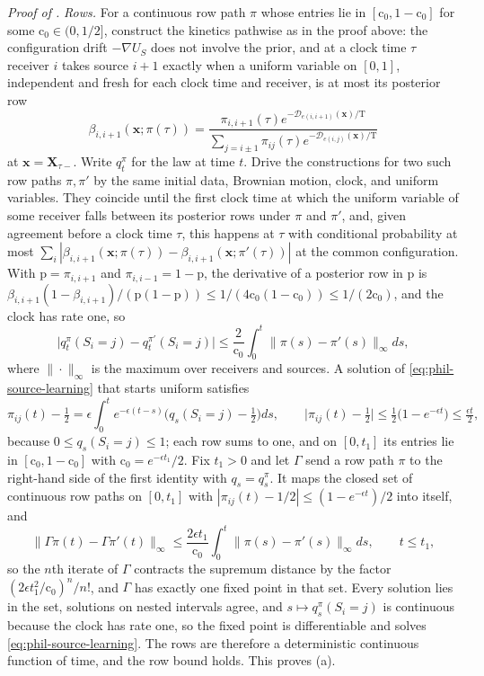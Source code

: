 \noindent\emph{Proof of .}
\emph{Rows.} For a continuous row path \(\pi\) whose entries lie in
\([\mathrm c_0,1-\mathrm c_0]\) for some \(\mathrm c_0\in(0,1/2]\), construct the
kinetics pathwise as in the proof above: the configuration drift
\(-\nabla U_S\) does not involve the prior, and at a clock time \(\tau\)
receiver \(i\) takes source \(i+1\) exactly when a uniform variable on
\([0,1]\), independent and fresh for each clock time and receiver, is at most
its posterior row
\[
\beta_{i,i+1}(\mathbf x;\pi(\tau))
=\frac{\pi_{i,i+1}(\tau)e^{-\mathcal D_{e(i,i+1)}(\mathbf x)/\mathrm T}}
{\sum_{j=i\pm1}\pi_{ij}(\tau)e^{-\mathcal D_{e(i,j)}(\mathbf x)/\mathrm T}}
\]
at \(\mathbf x=\mathbf X_{\tau-}\). Write \(q^\pi_t\) for the law at time
\(t\). Drive the constructions for two such row paths \(\pi,\pi'\) by the same
initial data, Brownian motion, clock, and uniform variables. They coincide
until the first clock time at which the uniform variable of some receiver falls
between its posterior rows under \(\pi\) and \(\pi'\), and, given agreement
before a clock time
\(\tau\), this happens at \(\tau\) with conditional probability at most
\(\sum_i|\beta_{i,i+1}(\mathbf x;\pi(\tau))-\beta_{i,i+1}(\mathbf x;\pi'(\tau))|\)
at the common configuration. With \(\mathrm p=\pi_{i,i+1}\) and
\(\pi_{i,i-1}=1-\mathrm p\), the derivative of a posterior row in \(\mathrm p\)
is \(\beta_{i,i+1}(1-\beta_{i,i+1})/(\mathrm p(1-\mathrm p))
\le1/(4\mathrm c_0(1-\mathrm c_0))\le1/(2\mathrm c_0)\), and the clock has rate
one, so
\[
\bigl|q^\pi_t(S_i=j)-q^{\pi'}_t(S_i=j)\bigr|
\le\frac2{\mathrm c_0}\int_0^t\|\pi(s)-\pi'(s)\|_\infty ds,
\]
where \(\|\cdot\|_\infty\) is the maximum over receivers and sources. A
solution of \cref{eq:phil-source-learning} that starts uniform satisfies
\[
\pi_{ij}(t)-\tfrac12=\epsilon\int_0^te^{-\epsilon(t-s)}
\bigl(q_s(S_i=j)-\tfrac12\bigr)ds,
\qquad
\bigl|\pi_{ij}(t)-\tfrac12\bigr|\le\tfrac12\bigl(1-e^{-\epsilon t}\bigr)
\le\tfrac{\epsilon t}2,
\]
because \(0\le q_s(S_i=j)\le1\); each row sums to one, and on \([0,t_1]\) its
entries lie in \([\mathrm c_0,1-\mathrm c_0]\) with
\(\mathrm c_0=e^{-\epsilon t_1}/2\). Fix \(t_1>0\) and let \(\Gamma\) send a row
path \(\pi\) to the right-hand side of the first identity with \(q_s=q^\pi_s\).
It maps the closed set of continuous row paths on \([0,t_1]\) with
\(|\pi_{ij}(t)-1/2|\le(1-e^{-\epsilon t})/2\) into itself, and
\[
\|\Gamma\pi(t)-\Gamma\pi'(t)\|_\infty
\le\frac{2\epsilon t_1}{\mathrm c_0}\int_0^t\|\pi(s)-\pi'(s)\|_\infty ds,
\qquad t\le t_1,
\]
so the \(n\)th iterate of \(\Gamma\) contracts the supremum distance by the
factor \((2\epsilon t_1^2/\mathrm c_0)^n/n!\), and \(\Gamma\) has exactly one
fixed point in that set. Every solution lies in the set, solutions on nested
intervals agree, and \(s\mapsto q^\pi_s(S_i=j)\) is continuous because the clock
has rate one, so the fixed point is differentiable and solves
\cref{eq:phil-source-learning}. The rows are therefore a deterministic
continuous function of time, and the row bound holds. This proves (a).

